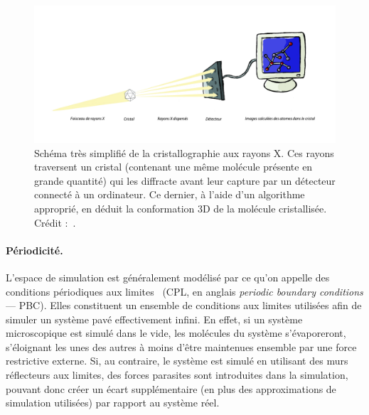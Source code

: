 	
	\begin{figure}[htb]
		\centering
		\includegraphics[width=\textwidth]{figures/ch1/crystal}
		\caption[Schéma très simplifié de la cristallographie aux rayons X]{Schéma très simplifié de la cristallographie aux rayons X. Ces rayons traversent un cristal (contenant une même molécule présente en grande quantité) qui les diffracte avant leur capture par un détecteur connecté à un ordinateur. Ce dernier, à l'aide d'un algorithme approprié, en déduit la conformation 3D de la molécule cristallisée. Crédit :~\cite{trellet2015exploration}.}
		\label{fig:crystal}
	\end{figure}
	
	\paragraph{Périodicité.}
	L'espace de simulation est généralement modélisé par ce qu'on appelle des conditions périodiques aux limites~\cite{cheatham1995molecular} (CPL, en anglais \emph{periodic boundary conditions} --- PBC). Elles constituent un ensemble de conditions aux limites utilisées afin de simuler un système pavé effectivement infini. En effet, si un système microscopique est simulé dans le vide, les molécules du système s'évaporeront, s'éloignant les unes des autres à moins d'être maintenues ensemble par une force restrictive externe. Si, au contraire, le système est simulé en utilisant des murs réflecteurs aux limites, des forces parasites sont introduites dans la simulation, pouvant donc créer un écart supplémentaire (en plus des approximations de simulation utilisées) par rapport au système réel.
	
